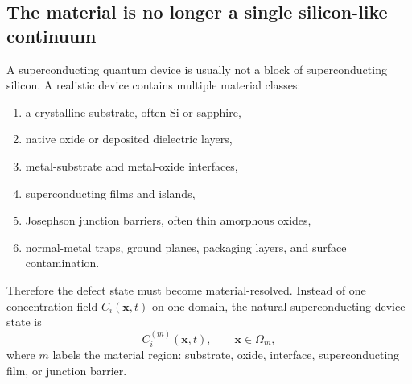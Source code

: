 \documentclass[11pt]{article}
\newcommand{\x}{\mathbf{x}}
\begin{document}
\subsection{The material is no longer a single silicon-like continuum}

A superconducting quantum device is usually not a block of superconducting silicon. A realistic device contains multiple material classes:
\begin{enumerate}[label=\arabic*.]
\item a crystalline substrate, often Si or sapphire,
\item native oxide or deposited dielectric layers,
\item metal-substrate and metal-oxide interfaces,
\item superconducting films and islands,
\item Josephson junction barriers, often thin amorphous oxides,
\item normal-metal traps, ground planes, packaging layers, and surface contamination.
\end{enumerate}

Therefore the defect state must become material-resolved. Instead of one concentration field $C_i(\x,t)$ on one domain, the natural superconducting-device state is
\begin{equation}
C_i^{(m)}(\x,t),
\qquad \x\in \Omega_m,
\label{eq:material_resolved_C}
\end{equation}
where $m$ labels the material region: substrate, oxide, interface, superconducting film, or junction barrier.
\end{document}

